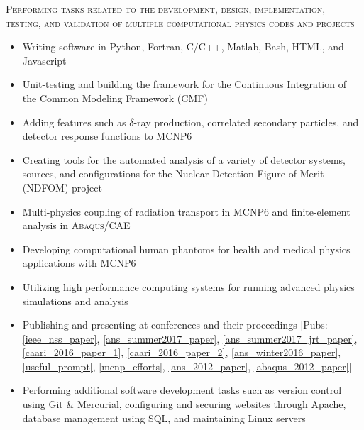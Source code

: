 \begin{center}
	\begin{minipage}{0.99\textwidth}
		\begin{center}
			\textsc{\Large Performing tasks related to the development, design, implementation, testing, and validation of multiple computational physics codes and projects} \vspace{2mm}
		\end{center}
	\end{minipage}
\end{center}
\begin{minipage}{\textwidth}
	\begin{center}
		\begin{itemize}
			\item Writing software in Python, Fortran, C/C++, Matlab, Bash, HTML, and Javascript
			\item Unit-testing and building the framework for the Continuous Integration of the Common Modeling Framework (CMF)
			\item Adding features such as $\delta$-ray production, correlated secondary particles, and detector response functions to \textsc{MCNP6} 
			\item Creating tools for the automated analysis of a variety of detector systems, sources, and configurations for the Nuclear Detection Figure of Merit (NDFOM) project
	    		\item Multi-physics coupling of radiation transport in \textsc{MCNP6} and finite-element analysis in \textsc{Abaqus/CAE} %
	    		\item Developing computational human phantoms for health and medical physics applications with \textsc{MCNP6} 
			\item Utilizing high performance computing systems for running advanced physics simulations and analysis
			\item Publishing and presenting at conferences and their proceedings [Pubs: \ref{ieee_nss_paper}, \ref{ans_summer2017_paper}, \ref{ans_summer2017_jrt_paper}, \ref{caari_2016_paper_1}, \ref{caari_2016_paper_2}, \ref{ans_winter2016_paper}, \ref{useful_prompt}, \ref{mcnp_efforts}, \ref{ans_2012_paper}, \ref{abaqus_2012_paper}]
			\item Performing additional software development tasks such as version control using Git \& Mercurial, configuring and securing websites through Apache, database management using SQL, and maintaining Linux servers
		\end{itemize}
	\end{center}
\end{minipage}


